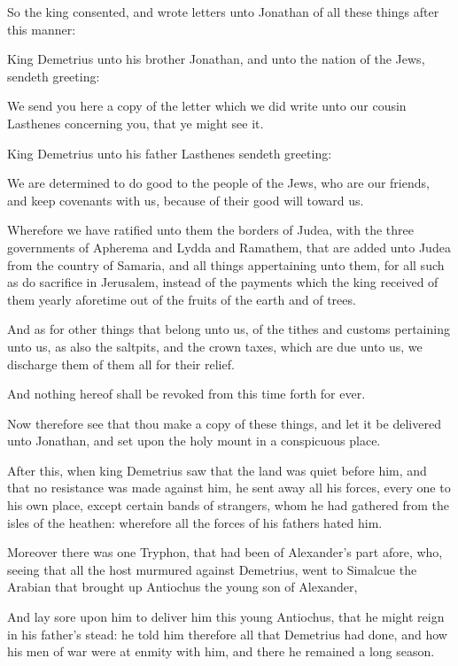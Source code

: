{\par }{\PP {}So the king consented, and wrote letters unto Jonathan of all these things after this manner:
\par }{\PP {}King Demetrius unto his brother Jonathan, and unto the nation of the Jews, sendeth greeting:
\par }{\PP {}We send you here a copy of the letter which we did write unto our cousin Lasthenes concerning you, that ye might see it.
\par }{\PP {}King Demetrius unto his father Lasthenes sendeth greeting:
\par }{\PP {}We are determined to do good to the people of the Jews, who are our friends, and keep covenants with us, because of their good will toward us.
\par }{\PP {}Wherefore we have ratified unto them the borders of Judea, with the three governments of Apherema and Lydda and Ramathem, that are added unto Judea from the country of Samaria, and all things appertaining unto them, for all such as do sacrifice in Jerusalem, instead of the payments which the king received of them yearly aforetime out of the fruits of the earth and of trees.
\par }{\PP {}And as for other things that belong unto us, of the tithes and customs pertaining unto us, as also the saltpits, and the crown taxes, which are due unto us, we discharge them of them all for their relief.
\par }{\PP {}And nothing hereof shall be revoked from this time forth for ever.
\par }{\PP {}Now therefore see that thou make a copy of these things, and let it be delivered unto Jonathan, and set upon the holy mount in a conspicuous place.
\par }{\PP {}After this, when king Demetrius saw that the land was quiet before him, and that no resistance was made against him, he sent away all his forces, every one to his own place, except certain bands of strangers, whom he had gathered from the isles of the heathen: wherefore all the forces of his fathers hated him.
\par }{\PP {}Moreover there was one Tryphon, that had been of Alexander’s part afore, who, seeing that all the host murmured against Demetrius, went to Simalcue the Arabian that brought up Antiochus the young son of Alexander,
\par }{\PP {}And lay sore upon him to deliver him this young Antiochus, that he might reign in his father’s stead: he told him therefore all that Demetrius had done, and how his men of war were at enmity with him, and there he remained a long season.
}
